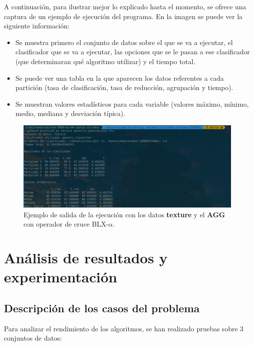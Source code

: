 \documentclass[11pt,a4paper]{article}
\begin{document}
A continuación, para ilustrar mejor lo explicado hasta el momento, se ofrece una captura de un ejemplo de ejecución del
programa. En la imagen se puede ver la siguiente información:

\begin{itemize}[label=\textbullet]
	\item Se muestra primero el conjunto de datos sobre el que se va a ejecutar, el clasificador que se va a ejecutar,
	las opciones que se le pasan a ese clasificador (que determinaran qué algoritmo utilizar) y el tiempo total.
	\item Se puede ver una tabla en la que aparecen los datos referentes a cada partición (tasa de clasificación, tasa de
	reducción, agrupación y tiempo).
	\item Se muestran valores estadísticos para cada variable (valores máximo, mínimo, medio, mediana y desviación típica).
\end{itemize}


\begin{figure}[H]
\centering
\includegraphics[scale=0.4]{img/out_example.png}
\caption{Ejemplo de salida de la ejecución con los datos \textbf{texture} y el \textbf{AGG}
con operador de cruce BLX-$\alpha$.}
\end{figure}

\newpage

\section{Análisis de resultados y experimentación}

\subsection{Descripción de los casos del problema}

Para analizar el rendimiento de los algoritmos, se han realizado pruebas sobre 3 conjuntos de datos:
\end{document}
